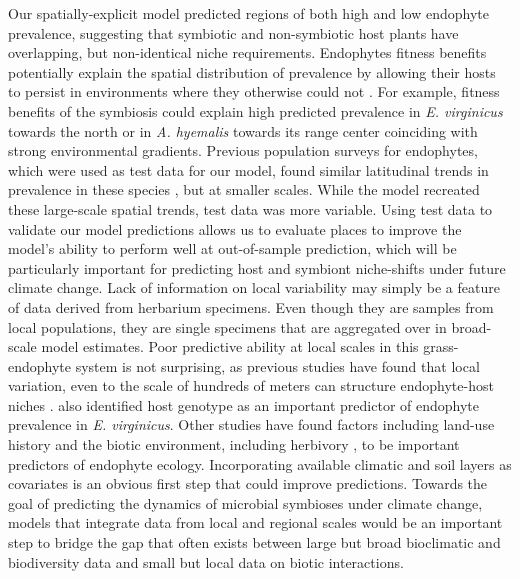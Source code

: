 \documentclass[11pt]{article}
\let\cite\citep
\begin{document}
Our spatially-explicit model predicted regions of both high and low endophyte prevalence, suggesting that symbiotic and non-symbiotic host plants have overlapping, but non-identical niche requirements.
Endophytes fitness benefits potentially explain the spatial distribution of prevalence by allowing their hosts to persist in environments where they otherwise could not \citep{afkhami2014mutualist, kazenel2015mutualistic}.
For example, fitness benefits of the symbiosis could explain high predicted prevalence in \emph{E. virginicus} towards the north or in \emph{A. hyemalis} towards its range center coinciding with strong environmental gradients.
Previous population surveys for endophytes, which were used as test data for our model, found similar latitudinal trends in prevalence in these species \citep{sneck2017variation,rudgers2009benefits}, but at smaller scales. 
While the model recreated these large-scale spatial trends, test data was more variable. 
Using test data to validate our model predictions allows us to evaluate places to improve the model's ability to perform well at out-of-sample prediction, which will be particularly important for predicting host and symbiont niche-shifts under future climate change.
Lack of information on local variability may simply be a feature of data derived from herbarium specimens. 
Even though they are samples from local populations, they are single specimens that are aggregated over in broad-scale model estimates.
Poor predictive ability at local scales in this grass-endophyte system is not surprising, as previous studies have found that local variation, even to the scale of hundreds of meters can structure endophyte-host niches \cite{kazenel2015mutualistic}. 
\citet{sneck2017variation} also identified host genotype as an important predictor of endophyte prevalence in \emph{E. virginicus}.
Other studies have found factors including land-use history \cite{vikuk2019infection} and the biotic environment, including herbivory \cite{rudgers2016long}, to be important predictors of endophyte ecology.
Incorporating available climatic and soil layers as covariates is an obvious first step that could improve predictions.
Towards the goal of predicting the dynamics of microbial symbioses under climate change, models that integrate data from local and regional scales would be an important step to bridge the gap that often exists between large but broad bioclimatic and biodiversity data and small but local data on biotic interactions.  \cite{miller2019recent, isaac2020data}
\end{document}
